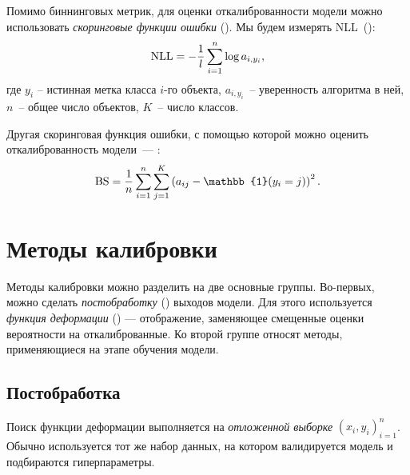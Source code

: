 \documentclass[12pt]{article}
\begin{document}
Помимо биннинговых метрик, для оценки откалиброванности модели можно использовать \emph{скоринговые функции ошибки} (). Мы будем измерять NLL~():
\begin{equation}\label{eq:nll}
    \operatorname{NLL}=-\frac{1}{l}\sum_{i=1}^n \log{a_{i, y_i}},
\end{equation}
где $y_i$ -- истинная метка класса $i$-го объекта, $a_{i, y_i}$~-- уверенность алгоритма в ней, $n$~-- общее число объектов, $K$~-- число классов.

Другая скоринговая функция ошибки, с помощью которой можно оценить откалиброванность модели~--- :
\begin{equation}
    \bs = \frac{1}{n}\sum_{i=1}^n \sum_{j=1}^K
    \left(a_{ij} - \mathbb{1}(y_i = j)\right)^2.
\end{equation}



\section{Методы калибровки}\label{sec:methods}
Методы калибровки можно разделить на две основные группы. Во-первых, можно сделать \emph{постобработку} () выходов модели. Для этого используется \emph{функция деформации} () — отображение, заменяющее смещенные оценки вероятности на откалиброванные. Ко второй группе относят методы, применяющиеся на этапе обучения модели.

\subsection{Постобработка}
Поиск функции деформации выполняется на \emph{отложенной выборке} $(x_i,y_i)_{i=1}^{n}$. Обычно используется тот же набор данных, на котором валидируется модель и подбираются гиперпараметры.

\end{document}
